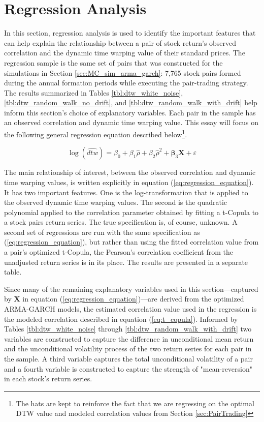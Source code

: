 \documentclass[12pt]{report}
\begin{document}
\chapter{Regression Analysis} \label{sec:Regression_Analysis}

In this section, regression analysis is used to identify the important features that can help explain the relationship between a pair of stock return's observed correlation and the dynamic time warping value of their standard prices. The regression sample is the same set of pairs that was constructed for the simulations in Section \ref{sec:MC_sim_arma_garch}: 7,765 stock pairs formed during the annual formation periods while executing the pair-trading strategy. The results summarized in Tables \ref{tbl:dtw_white_noise}, \ref{tbl:dtw_random_walk_no_drift}, and \ref{tbl:dtw_random_walk_with_drift} help inform this section's choice of explanatory variables. Each pair in the sample has an observed correlation and dynamic time warping value. This essay will focus on the following general regression equation described below\footnote{The hats are kept to reinforce the fact that we are regressing on the optimal DTW value and modeled correlation values from Section \ref{sec:PairTrading}}.

\begin{equation} \label{eq:regression_equation}
    \log(\widehat{dtw}) = \beta_{0} + \beta_{1} \hat{\rho} + \beta_{2} \hat{\rho}^{2} + \boldsymbol{\beta}_{3} \boldsymbol{X} + \varepsilon
\end{equation}

The main relationship of interest, between the observed correlation and dynamic time warping values, is written explicitly in equation (\ref{eq:regression_equation}). It has two important features. One is the log-transformation that is applied to the observed dynamic time warping values. The second is the quadratic polynomial applied to the correlation parameter obtained by fitting a t-Copula to a stock pairs return series. The true specification is, of course, unknown. A second set of regressions are run with the same specification as (\ref{eq:regression_equation}), but rather than using the fitted correlation value from a pair's optimized t-Copula, the Pearson's correlation coefficient from the unadjusted return series is in its place. The results are presented in a separate table.

Since many of the remaining explanatory variables used in this section---captured by $\boldsymbol{X}$ in equation (\ref{eq:regression_equation})---are derived from the optimized ARMA-GARCH models, the estimated correlation value used in the regression is the modeled correlation described in equation (\ref{eq:t_copula}). Informed by Tables \ref{tbl:dtw_white_noise} through \ref{tbl:dtw_random_walk_with_drift} two variables are constructed to capture the difference in unconditional mean return and the unconditional volatility process of the two return series for each pair in the sample. A third variable captures the total unconditional volatility of a pair and a fourth variable is constructed to capture the strength of "mean-reversion" in each stock's return series.
\end{document}

